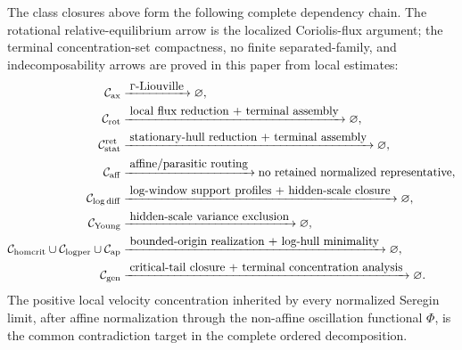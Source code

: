 \documentclass[11pt]{amsart}
\numberwithin{equation}{section}
\theoremstyle{plain}
\theoremstyle{definition}
\theoremstyle{remark}
\newcommand{\Cax}{\mathcal C_{\mathrm{ax}}}
\newcommand{\Crot}{\mathcal C_{\mathrm{rot}}}
\newcommand{\Cstat}{\mathcal C_{\mathrm{stat}}^{\mathrm{ret}}}
\newcommand{\Caff}{\mathcal C_{\mathrm{aff}}}
\newcommand{\Cgen}{\mathcal C_{\mathrm{gen}}}
\newcommand{\Chomcrit}{\mathcal C_{\mathrm{homcrit}}}
\newcommand{\Clogper}{\mathcal C_{\mathrm{logper}}}
\newcommand{\Capcrit}{\mathcal C_{\mathrm{ap}}}
\newcommand{\Cyoung}{\mathcal C_{\mathrm{Young}}}
\newcommand{\Clogdiff}{\mathcal C_{\log\mathrm{diff}}}
\begin{document}
The class closures above form the following complete dependency chain.  The rotational
relative-equilibrium arrow is the localized Coriolis-flux argument; the terminal
concentration-set compactness, no finite separated-family, and indecomposability
arrows are proved in this paper from local estimates:
\[
\begin{aligned}
\Cax
   &\xrightarrow{\;\Gamma\hbox{-Liouville}\;}
   \varnothing,\\
\Crot
   &\xrightarrow{\;\hbox{local flux reduction + terminal assembly}\;}
   \varnothing,\\
\Cstat
   &\xrightarrow{\;\hbox{stationary-hull reduction + terminal assembly}\;}
   \varnothing,\\
\Caff
   &\xrightarrow{\;\hbox{affine/parasitic routing}\;}
   \hbox{no retained normalized representative},\\
\Clogdiff
   &\xrightarrow{\;\hbox{log-window support profiles + hidden-scale closure}\;}
   \varnothing,\\
\Cyoung
   &\xrightarrow{\;\hbox{hidden-scale variance exclusion}\;}
   \varnothing,\\
\Chomcrit\cup\Clogper\cup\Capcrit
   &\xrightarrow{\;\hbox{bounded-origin realization + log-hull minimality}\;}
   \varnothing,\\
\Cgen
   &\xrightarrow{\;\hbox{critical-tail closure + terminal concentration analysis}\;}
   \varnothing .
\end{aligned}
\]
The positive local velocity concentration inherited by every normalized Seregin limit,
after affine normalization through the non-affine oscillation functional
\(\Phi\), is the common contradiction target in the complete ordered
decomposition.
\end{document}
